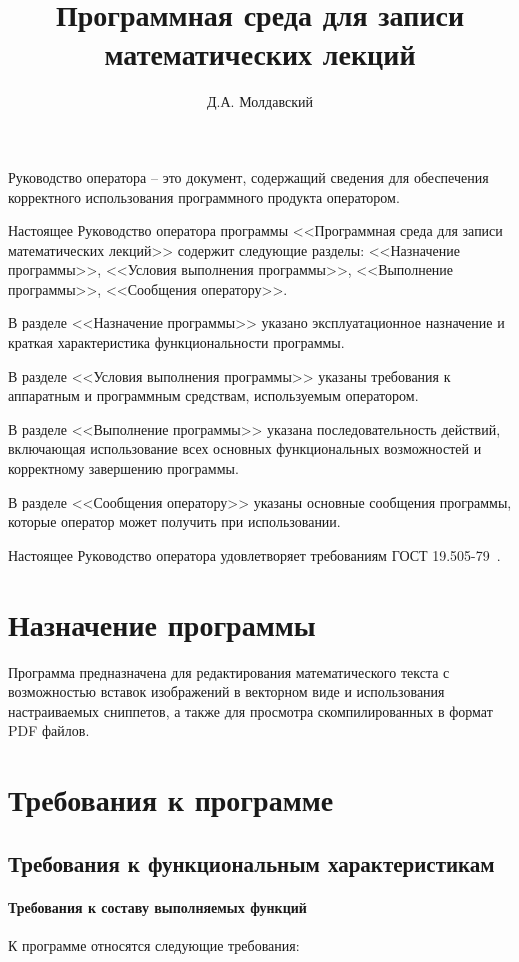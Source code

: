 \documentclass[opermanual]{espd}
\author{Д.А. Молдавский}
\title{Программная среда для записи\\математических лекций}
\begin{document}
\annotation

Руководство оператора -- это документ, содержащий сведения для обеспечения корректного использования программного продукта оператором.

Настоящее Руководство оператора программы <<Программная среда для записи математических лекций>>  содержит следующие разделы: <<Назначение программы>>, <<Условия выполнения программы>>, <<Выполнение программы>>, <<Сообщения оператору>>.

В разделе <<Назначение программы>> указано эксплуатационное назначение и краткая характеристика функциональности программы.

В разделе <<Условия выполнения программы>> указаны требования к аппаратным и программным средствам, используемым оператором.

В разделе <<Выполнение программы>> указана последовательность действий, включающая использование всех основных функциональных возможностей и корректному завершению программы.

В разделе <<Сообщения оператору>> указаны основные сообщения программы, которые оператор может получить при использовании.

Настоящее Руководство оператора удовлетворяет требованиям ГОСТ 19.505-79~\cite{espd505}.

\tableofcontents

\section{Назначение программы}
Программа предназначена для редактирования математического текста с возможностью вставок изображений в векторном виде и использования настраиваемых сниппетов, а также для просмотра скомпилированных в формат PDF файлов.

\section{Требования к программе}
\subsection{Требования к функциональным характеристикам}
\paragraph{Требования к составу выполняемых функций}
К программе относятся следующие требования:
\end{document}

